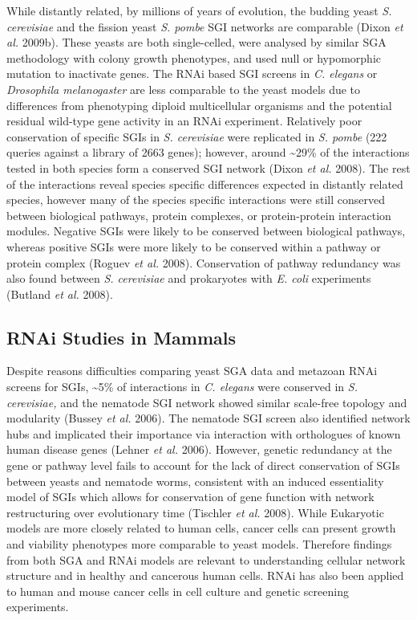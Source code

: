 While distantly related, by millions of years of evolution, the budding
yeast \textit{S. cerevisiae} and the fission yeast \textit{S. pombe}
SGI networks are comparable (Dixon\textit{ et al.} 2009b). These
yeasts are both single-celled, were analysed by similar SGA methodology
with colony growth phenotypes, and used null or hypomorphic mutation to
inactivate genes. The RNAi based SGI screens in \textit{C. elegans
}or \textit{Drosophila melanogaster} are less comparable to the yeast
models due to differences from phenotyping diploid multicellular
organisms and the potential residual wild-type gene activity in an RNAi
experiment. Relatively poor conservation of specific SGIs in
\textit{S. cerevisiae} were replicated in \textit{S. pombe} (222
queries against a library of 2663 genes); however, around \~{}29\% of
the interactions tested in both species form a conserved SGI network
(Dixon\textit{ et al.} 2008). The rest of the interactions reveal
species specific differences expected in distantly related species,
however many of the species specific interactions were still conserved
between biological pathways, protein complexes, or protein-protein
interaction modules. Negative SGIs were likely to be conserved
between biological pathways, whereas positive SGIs were more likely to
be conserved within a pathway or protein complex (Roguev\textit{ et
al.} 2008). Conservation of pathway redundancy was also found between
\textit{S. cerevisiae} and prokaryotes with \textit{E. coli}
experiments (Butland\textit{ et al.} 2008). 


\subsection[RNAi Studies in Mammals]{RNAi Studies in Mammals}

Despite reasons difficulties comparing yeast SGA data and metazoan RNAi
screens for SGIs, \~{}5\% of interactions in \textit{C. elegans} were
conserved in \textit{S. cerevisiae,} and the nematode SGI network
showed similar scale-free topology and modularity (Bussey\textit{ et
al.} 2006). The nematode SGI screen also identified network hubs and
implicated their importance via interaction with orthologues of known
human disease genes (Lehner\textit{ et al.} 2006). However, genetic
redundancy at the gene or pathway level fails to account for the lack
of direct conservation of SGIs between yeasts and nematode worms,
consistent with an induced essentiality model of SGIs which allows for
conservation of gene function with network restructuring over
evolutionary time (Tischler\textit{ et al.} 2008). While Eukaryotic
models are more closely related to human cells, cancer cells can
present growth and viability phenotypes more comparable to yeast
models. Therefore findings from both SGA and RNAi models are relevant
to understanding cellular network structure and in healthy and
cancerous human cells. RNAi has also been applied to human and mouse
cancer cells in cell culture and genetic screening experiments. 


